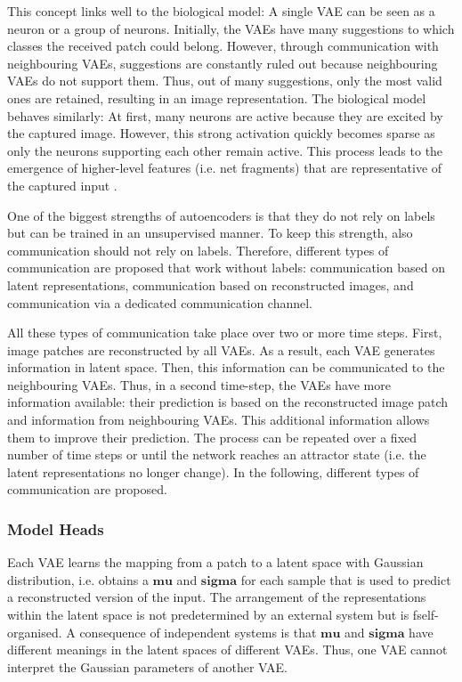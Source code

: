 This concept links well to the biological model: A single VAE can be seen as a neuron or a group of neurons. Initially, the VAEs have many suggestions to which classes the received patch could belong. However, through communication with neighbouring VAEs, suggestions are constantly ruled out because neighbouring VAEs do not support them. Thus, out of many suggestions, only the most valid ones are retained, resulting in an image representation. The biological model behaves similarly: At first, many neurons are active because they are excited by the captured image. However, this strong activation quickly becomes sparse as only the neurons supporting each other remain active. This process leads to the emergence of higher-level features (i.e. net fragments) that are representative of the captured input .

One of the biggest strengths of autoencoders is that they do not rely on labels but can be trained in an unsupervised manner. To keep this strength, also communication should not rely on labels. Therefore, different types of communication are proposed that work without labels: communication based on latent representations, communication based on reconstructed images, and communication via a dedicated communication channel.

All these types of communication take place over two or more time steps. First, image patches are reconstructed by all VAEs. As a result, each VAE generates information in latent space. Then, this information can be communicated to the neighbouring VAEs. Thus, in a second time-step, the VAEs have more information available: their prediction is based on the reconstructed image patch and information from neighbouring VAEs. This additional information allows them to improve their prediction. The process can be repeated over a fixed number of time steps or until the network reaches an attractor state (i.e. the latent representations no longer change). In the following, different types of communication are proposed.


\subsubsection{Model Heads}
Each VAE learns the mapping from a patch to a latent space with Gaussian distribution, i.e. obtains a $\boldsymbol{mu}$ and $\boldsymbol{sigma}$ for each sample that is used to predict a reconstructed version of the input.
The arrangement of the representations within the latent space is not predetermined by an external system but is fself-organised. A consequence of independent systems is that $\boldsymbol{mu}$ and $\boldsymbol{sigma}$ have different meanings in the latent spaces of different VAEs. Thus, one VAE cannot interpret the Gaussian parameters of another VAE.

